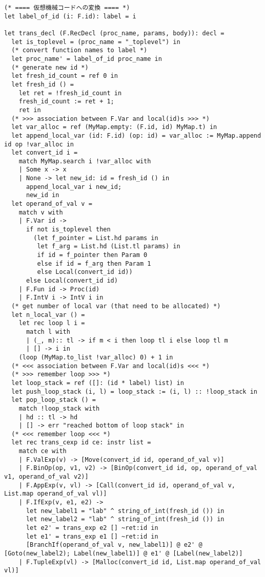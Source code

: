 \begin{lstlisting}[caption=vm.ml]
(* ==== 仮想機械コードへの変換 ==== *)
let label_of_id (i: F.id): label = i

let trans_decl (F.RecDecl (proc_name, params, body)): decl =
  let is_toplevel = (proc_name = "_toplevel") in
  (* convert function names to label *)
  let proc_name' = label_of_id proc_name in
  (* generate new id *)
  let fresh_id_count = ref 0 in
  let fresh_id () = 
    let ret = !fresh_id_count in
    fresh_id_count := ret + 1;
    ret in
  (* >>> association between F.Var and local(id)s >>> *)
  let var_alloc = ref (MyMap.empty: (F.id, id) MyMap.t) in
  let append_local_var (id: F.id) (op: id) = var_alloc := MyMap.append id op !var_alloc in
  let convert_id i = 
    match MyMap.search i !var_alloc with
    | Some x -> x
    | None -> let new_id: id = fresh_id () in
      append_local_var i new_id;
      new_id in
  let operand_of_val v = 
    match v with
    | F.Var id -> 
      if not is_toplevel then 
        (let f_pointer = List.hd params in
         let f_arg = List.hd (List.tl params) in
         if id = f_pointer then Param 0
         else if id = f_arg then Param 1
         else Local(convert_id id))
      else Local(convert_id id)
    | F.Fun id -> Proc(id)
    | F.IntV i -> IntV i in
  (* get number of local var (that need to be allocated) *)
  let n_local_var () = 
    let rec loop l i = 
      match l with
      | (_, m):: tl -> if m < i then loop tl i else loop tl m 
      | [] -> i in
    (loop (MyMap.to_list !var_alloc) 0) + 1 in
  (* <<< association between F.Var and local(id)s <<< *)
  (* >>> remember loop >>> *)
  let loop_stack = ref ([]: (id * label) list) in
  let push_loop_stack (i, l) = loop_stack := (i, l) :: !loop_stack in
  let pop_loop_stack () = 
    match !loop_stack with
    | hd :: tl -> hd
    | [] -> err "reached bottom of loop stack" in
  (* <<< remember loop <<< *)
  let rec trans_cexp id ce: instr list = 
    match ce with
    | F.ValExp(v) -> [Move(convert_id id, operand_of_val v)]
    | F.BinOp(op, v1, v2) -> [BinOp(convert_id id, op, operand_of_val v1, operand_of_val v2)]
    | F.AppExp(v, vl) -> [Call(convert_id id, operand_of_val v, List.map operand_of_val vl)]
    | F.IfExp(v, e1, e2) -> 
      let new_label1 = "lab" ^ string_of_int(fresh_id ()) in
      let new_label2 = "lab" ^ string_of_int(fresh_id ()) in
      let e2' = trans_exp e2 [] ~ret:id in
      let e1' = trans_exp e1 [] ~ret:id in
      [BranchIf(operand_of_val v, new_label1)] @ e2' @ [Goto(new_label2); Label(new_label1)] @ e1' @ [Label(new_label2)]
    | F.TupleExp(vl) -> [Malloc(convert_id id, List.map operand_of_val vl)]

\end{lstlisting}
